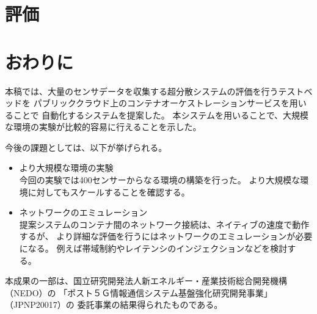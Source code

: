 \documentclass[submit,techrep]{ipsj}
\begin{document}
\section{評価}\label{sec:evaluation}

\section{おわりに}\label{sec:conclusion}
本稿では、大量のセンサデータを収集する超分散システムの評価を行うテストベッドを
パブリッククラウド上のコンテナオーケストレーションサービスを用いることで
自動化するシステムを提案した。
本システムを用いることで、大規模な環境の実験が比較的容易に行えることを示した。

今後の課題としては、以下が挙げられる。
\begin{itemize}
  \item より大規模な環境の実験\\
  今回の実験では400センサーからなる環境の構築を行った。
  より大規模な環境に対してもスケールすることを確認する。
  
  \item ネットワークのエミュレーション\\
  提案システムのコンテナ間のネットワーク接続は、ネイティブの速度で動作するが、
  より詳細な評価を行うにはネットワークのエミュレーションが必要になる。
  例えば帯域制約やレイテンシのインジェクションなどを検討する。

\end{itemize}

\begin{acknowledgment}
本成果の一部は、国立研究開発法人新エネルギー・産業技術総合開発機構（NEDO）の
「ポスト５Ｇ情報通信システム基盤強化研究開発事業」（JPNP20017）の
委託事業の結果得られたものである。
\end{acknowledgment}



\end{document}
